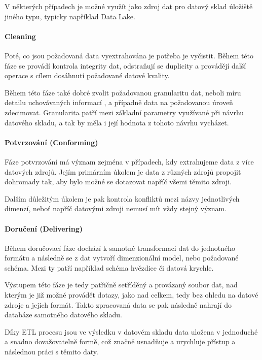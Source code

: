 \documentclass[
  digital,     %
  twoside,     %
  lof,         %
  lot,         %
]{fithesis4}
\begin{document}
V některých případech je možné využít jako zdroj dat pro datový sklad úložiště jiného typu, typicky například Data Lake.

\paragraph{Cleaning}
Poté, co jsou požadovaná data vyextrahována je potřeba je vyčistit. Během této fáze se provádí kontrola integrity dat, odstraňují se duplicity a provádějí další operace s cílem dosáhnutí požadované datové kvality.\parencite[s.~18-19]{Kimballc2004}

Během této fáze také dobré zvolit požadovanou granularitu dat, neboli míru detailu uchovávaných informací \parencite[s.~41]{Inmon2005}, a případně data na požadovanou úroveň zdecimovat. Granularita patří mezi základní parametry využívané při návrhu datového skladu, a tak by měla i její hodnota z tohoto návrhu vycházet.\parencite[s.~41]{Inmon2005}

\paragraph{Potvrzování (Conforming)}
Fáze potvrzování má význam zejména v případech, kdy extrahujeme data z více datových zdrojů. Jejím primárním úkolem je data z různých zdrojů propojit dohromady tak, aby bylo možné se dotazovat napříč všemi těmito zdroji. \parencite[s.~19]{Kimballc2004}

Dalším důležitým úkolem je pak kontrola konfliktů mezi názvy jednotlivých dimenzí, neboť napříč datovými zdroji nemusí mít vždy stejný význam. \parencite{Kimballc2004}

\paragraph{Doručení (Delivering)}
Během doručovací fáze dochází k samotné transformaci dat do jednotného formátu a následně se z dat vytvoří dimenzionální model, nebo požadované schéma. Mezi ty patří například schéma hvězdice či datová krychle.\parencite[s.~19]{Kimballc2004}

Výstupem této fáze je tedy patřičně setříděný a provázaný soubor dat, nad kterým je již možné provádět dotazy, jako nad celkem, tedy bez ohledu na datové zdroje a jejich formát. Takto zpracovaná data se pak následně nahrají do databáze samotného datového skladu.

Díky ETL procesu jsou ve výsledku v datovém skladu data uložena v jednoduché a snadno dovažovatelně formě, což značně usnadňuje a urychluje přístup a následnou práci s těmito daty.
\end{document}

